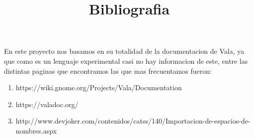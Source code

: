 \documentclass{article}
\title{Bibliografia}
\begin{document}
  \maketitle

  En este proyecto nos basamos en su totalidad de la documentacion de Vala, ya que como es un lenguaje experimental
  casi no hay informacion de este, entre las distintas paginas que encontramos las que mas frecuentamos fueron:

  \begin{enumerate}
    \item https://wiki.gnome.org/Projects/Vala/Documentation

    \item https://valadoc.org/

    \item http://www.devjoker.com/contenidos/catss/140/Importacion-de-espacios-de-nombres.aspx
  \end{enumerate}
\end{document}
